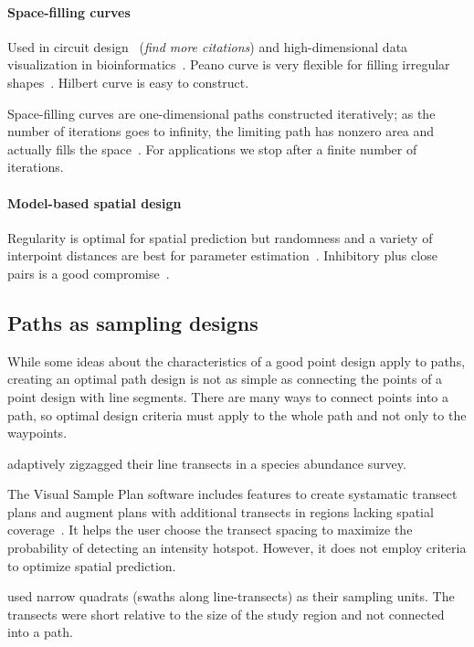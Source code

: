 \documentclass[review]{elsarticle}
\begin{document}
\paragraph{Space-filling curves}
Used in circuit design~\citep{fanetal} ({\it find more citations}) and
high-dimensional data visualization in bioinformatics~\citep{hilbertvis}.
Peano curve is very flexible for filling irregular shapes~\citep{fanetal}.
Hilbert curve is easy to construct.

Space-filling curves are one-dimensional paths constructed iteratively; as the
number of iterations goes to infinity, the limiting path has nonzero area and
actually fills the space~\citep{sagan}. For applications we stop after a finite
number of iterations.


\paragraph{Model-based spatial design}
Regularity is optimal for spatial prediction but randomness and a variety of
interpoint distances are best for parameter estimation~\citep{diggle}.
Inhibitory plus close pairs is a good compromise~\citep{chipetaetal2017}.


\subsection{Paths as sampling designs}

While some ideas about the characteristics of a good point design apply to
paths, creating an optimal path design is not as simple as connecting the
points of a point design with line segments. There are many ways to connect
points into a path, so optimal design criteria must apply to the whole path and
not only to the waypoints.

\citet{pollard} adaptively zigzagged their line transects in a species
abundance survey.

The Visual Sample Plan software includes features to create systamatic transect
plans and augment plans with additional transects in regions lacking spatial
coverage~\citep{vspguide}. It helps the user choose the transect spacing to
maximize the probability of detecting an intensity hotspot. However, it does
not employ criteria to optimize spatial prediction.

\citet{liuvanhatalo} used narrow quadrats (swaths along line-transects) as
their sampling units. The transects were short relative to the size of the
study region and not connected into a path.
\end{document}
